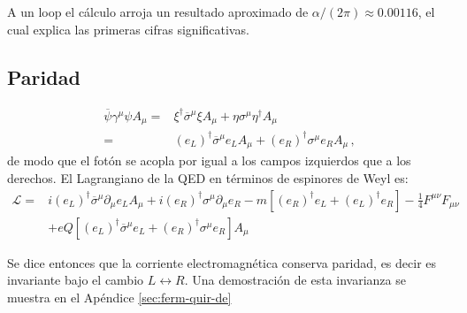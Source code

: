 A un loop el cálculo arroja un resultado aproximado de $\alpha/(2\pi)\approx 0.00116$, el cual explica las primeras cifras significativas.
\subsection{Paridad}
\begin{frame}
\begin{align}
  \overline{\psi}\gamma^{\mu}\psi A_{\mu}=&
\xi^{\dagger}\overline{\sigma}^{\mu}\xi A_{\mu}+\eta\sigma^{\mu}\eta^{\dagger} A_{\mu}\nonumber\\
=&(e_L)^{\dagger}\overline{\sigma}^{\mu}e_L A_{\mu}+(e_R)^{\dagger}\sigma^{\mu}e_{R} A_{\mu}\,,
\end{align}
de modo que el fotón se acopla por igual a los campos izquierdos que a los derechos. El Lagrangiano de la QED en términos de espinores de Weyl es:
\begin{align}
  \mathcal{L}=&i(e_L)^{\dagger}\overline{\sigma}^{\mu}\partial_{\mu}e_L A_{\mu}+i(e_R)^{\dagger}\sigma^{\mu}\partial_{\mu}e_{R}
-m \left[ \left( e_R \right)^\dagger e_L+\left( e_L \right)^{\dagger}e_R \right] -\tfrac{1}{4}F^{\mu\nu}F_{\mu\nu}\nonumber\\
   &+eQ \left[(e_L)^{\dagger}\overline{\sigma}^{\mu}e_L+(e_R)^{\dagger}\sigma^{\mu}e_{R}  \right] A_{\mu}
\end{align}
\end{frame}
Se dice entonces que la corriente  electromagnética conserva paridad, es decir es invariante bajo el cambio $L\leftrightarrow R$. 
Una demostración de esta invarianza se muestra en el Apéndice \ref{sec:ferm-quir-de}

